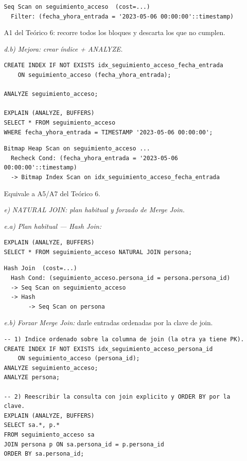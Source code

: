 \documentclass[11pt,a4paper]{article}
\begin{document}
\begin{lstlisting}[style=shellstyle]
Seq Scan on seguimiento_acceso  (cost=...)
  Filter: (fecha_yhora_entrada = '2023-05-06 00:00:00'::timestamp)
\end{lstlisting}

A1 del Teórico 6: recorre todos los bloques y descarta los que no cumplen.

\textit{d.b) Mejora: crear índice + ANALYZE.}

\begin{lstlisting}
CREATE INDEX IF NOT EXISTS idx_seguimiento_acceso_fecha_entrada
    ON seguimiento_acceso (fecha_yhora_entrada);

ANALYZE seguimiento_acceso;

EXPLAIN (ANALYZE, BUFFERS)
SELECT * FROM seguimiento_acceso
WHERE fecha_yhora_entrada = TIMESTAMP '2023-05-06 00:00:00';
\end{lstlisting}

\begin{lstlisting}[style=shellstyle]
Bitmap Heap Scan on seguimiento_acceso ...
  Recheck Cond: (fecha_yhora_entrada = '2023-05-06 00:00:00'::timestamp)
  -> Bitmap Index Scan on idx_seguimiento_acceso_fecha_entrada
\end{lstlisting}

Equivale a A5/A7 del Teórico 6.

\textit{e) NATURAL JOIN: plan habitual y forzado de Merge Join.}

\textit{e.a) Plan habitual --- Hash Join:}

\begin{lstlisting}
EXPLAIN (ANALYZE, BUFFERS)
SELECT * FROM seguimiento_acceso NATURAL JOIN persona;
\end{lstlisting}

\begin{lstlisting}[style=shellstyle]
Hash Join  (cost=...)
  Hash Cond: (seguimiento_acceso.persona_id = persona.persona_id)
  -> Seq Scan on seguimiento_acceso
  -> Hash
       -> Seq Scan on persona
\end{lstlisting}

\textit{e.b) Forzar Merge Join:} darle entradas ordenadas por la clave de join.

\begin{lstlisting}
-- 1) Indice ordenado sobre la columna de join (la otra ya tiene PK).
CREATE INDEX IF NOT EXISTS idx_seguimiento_acceso_persona_id
    ON seguimiento_acceso (persona_id);
ANALYZE seguimiento_acceso;
ANALYZE persona;

-- 2) Reescribir la consulta con join explicito y ORDER BY por la clave.
EXPLAIN (ANALYZE, BUFFERS)
SELECT sa.*, p.*
FROM seguimiento_acceso sa
JOIN persona p ON sa.persona_id = p.persona_id
ORDER BY sa.persona_id;
\end{lstlisting}
\end{document}

